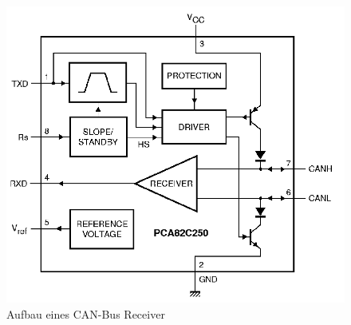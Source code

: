 \begin{figure}[H]
	\begin{center}	
		\includegraphics[scale=0.35]{figures/hcis/can_receiver.png}
		\caption{Aufbau eines CAN-Bus Receiver}
		\label{abb:CAN_Receiver}
	\end{center}
\end{figure}

